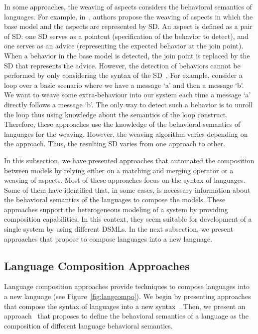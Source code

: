 In some approaches, the weaving of aspects considers the behavioral semantics of languages. For example, in~\cite{rambib}, authors propose the weaving of aspects in which the base model and the aspects are represented by SD. An aspect is defined as a pair of SD: one SD serves as a pointcut (specification of the behavior to detect), and one serves as an advice (representing the expected behavior at the join point). When a behavior in the base model is detected, the join point is replaced by the SD that represents the advice. However, the detection of behaviors cannot be performed by only considering the syntax of the SD~\cite{problemsweavebib}. For example, consider a loop over a basic scenario where we have a message `a' and then a message `b'. We want to weave some extra-behaviour into our system each time a message `a' directly follows a message `b'. The only way to detect such a behavior is to unroll the loop thus using knowledge about the semantics of the loop construct. Therefore, these approaches use the knowledge of the behavioral semantics of languages for the weaving. However, the weaving algorithm varies depending on the approach. Thus, the resulting SD varies from one approach to other.

In this subsection, we have presented approaches that automated the composition between models by relying either on a matching and merging operator or a weaving of aspects. Most of these approaches focus on the syntax of languages. Some of them have identified that, in some cases, is necessary information about the behavioral semantics of the languages to compose the models. These approaches support the heterogeneous modeling of a system by providing composition capabilities. In this context, they seem suitable for development of a single system by using different DSMLs. In the next subsection, we present approaches that propose to compose languages into a new language.

\subsection{Language Composition Approaches}
Language composition approaches provide techniques to compose languages into a new language (see Figure~\ref{fig:langcompo}). We begin by presenting approaches that compose the syntax of languages into a new syntax~\cite{metamodelcompo}. Then, we present an approach~\cite{semanticsanchoring} that proposes to define the behavioral semantics of a language as the composition of different language behavioral semantics. 

